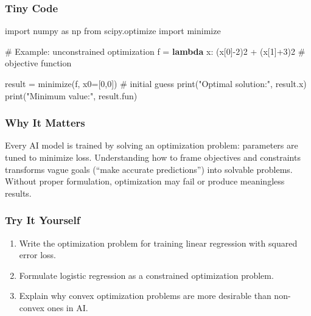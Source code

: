 \documentclass[
  letterpaper,
  DIV=11,
  numbers=noendperiod]{scrreprt}
\newenvironment{Shaded}{\begin{snugshade}}{\end{snugshade}}
\newcommand{\BuiltInTok}[1]{\textcolor[rgb]{0.00,0.23,0.31}{#1}}
\newcommand{\CommentTok}[1]{\textcolor[rgb]{0.37,0.37,0.37}{#1}}
\newcommand{\DecValTok}[1]{\textcolor[rgb]{0.68,0.00,0.00}{#1}}
\newcommand{\ImportTok}[1]{\textcolor[rgb]{0.00,0.46,0.62}{#1}}
\newcommand{\KeywordTok}[1]{\textcolor[rgb]{0.00,0.23,0.31}{\textbf{#1}}}
\newcommand{\NormalTok}[1]{\textcolor[rgb]{0.00,0.23,0.31}{#1}}
\newcommand{\OperatorTok}[1]{\textcolor[rgb]{0.37,0.37,0.37}{#1}}
\newcommand{\StringTok}[1]{\textcolor[rgb]{0.13,0.47,0.30}{#1}}
\providecommand{\tightlist}{%
  \setlength{\itemsep}{0pt}\setlength{\parskip}{0pt}}
\begin{document}
\subsubsection{Tiny Code}\label{tiny-code-140}

\begin{Shaded}
\begin{Highlighting}[]
\ImportTok{import}\NormalTok{ numpy }\ImportTok{as}\NormalTok{ np}
\ImportTok{from}\NormalTok{ scipy.optimize }\ImportTok{import}\NormalTok{ minimize}

\CommentTok{\# Example: unconstrained optimization}
\NormalTok{f }\OperatorTok{=} \KeywordTok{lambda}\NormalTok{ x: (x[}\DecValTok{0}\NormalTok{]}\OperatorTok{{-}}\DecValTok{2}\NormalTok{)}\DecValTok{2} \OperatorTok{+}\NormalTok{ (x[}\DecValTok{1}\NormalTok{]}\OperatorTok{+}\DecValTok{3}\NormalTok{)}\DecValTok{2}  \CommentTok{\# objective function}

\NormalTok{result }\OperatorTok{=}\NormalTok{ minimize(f, x0}\OperatorTok{=}\NormalTok{[}\DecValTok{0}\NormalTok{,}\DecValTok{0}\NormalTok{])  }\CommentTok{\# initial guess}
\BuiltInTok{print}\NormalTok{(}\StringTok{"Optimal solution:"}\NormalTok{, result.x)}
\BuiltInTok{print}\NormalTok{(}\StringTok{"Minimum value:"}\NormalTok{, result.fun)}
\end{Highlighting}
\end{Shaded}

\subsubsection{Why It Matters}\label{why-it-matters-38}

Every AI model is trained by solving an optimization problem: parameters
are tuned to minimize loss. Understanding how to frame objectives and
constraints transforms vague goals (``make accurate predictions'') into
solvable problems. Without proper formulation, optimization may fail or
produce meaningless results.

\subsubsection{Try It Yourself}\label{try-it-yourself-140}

\begin{enumerate}
\def\labelenumi{\arabic{enumi}.}
\tightlist
\item
  Write the optimization problem for training linear regression with
  squared error loss.
\item
  Formulate logistic regression as a constrained optimization problem.
\item
  Explain why convex optimization problems are more desirable than
  non-convex ones in AI.
\end{enumerate}
\end{document}
